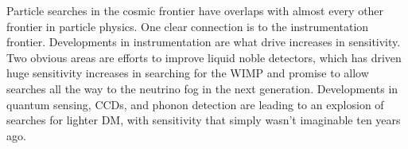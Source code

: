 \documentclass[nofootinbib]{article}
\begin{document}



\vspace{1em}

Particle searches in the cosmic frontier have overlaps with almost every other frontier in particle physics. One clear connection is to the instrumentation frontier. Developments in instrumentation are what drive increases in sensitivity. Two obvious areas are efforts to improve liquid noble detectors, which has driven huge sensitivity increases in searching for the WIMP and promise to allow searches all the way to the neutrino fog in the next generation. Developments in quantum sensing, CCDs, and phonon detection are leading to an explosion of searches for lighter DM, with sensitivity that simply wasn't imaginable ten years ago. 
\end{document}
